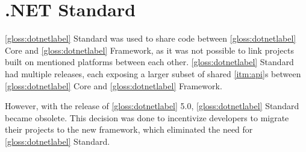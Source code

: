 \section{.NET Standard}
\ref{gloss:dotnetlabel} Standard was used to share code between \ref{gloss:dotnetlabel} Core and \ref{gloss:dotnetlabel} Framework, as it was not possible to link projects built on mentioned platforms between each other. \ref{gloss:dotnetlabel} Standard had multiple releases, each exposing a larger subset of shared \ref{itm:api}s between \ref{gloss:dotnetlabel} Core and \ref{gloss:dotnetlabel} Framework.

However, with the release of \ref{gloss:dotnetlabel} 5.0, \ref{gloss:dotnetlabel} Standard became obsolete. This decision was done to incentivize developers to migrate their projects to the new framework, which eliminated the need for \ref{gloss:dotnetlabel} Standard.